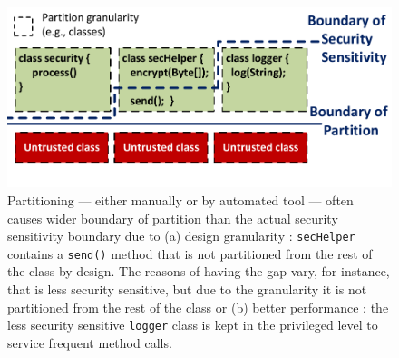 


\begin{figure}[t!]
\centering
\includegraphics[width=\linewidth]{figures/partition.pdf}
\footnotesize
\vspace{-0.3in}
\caption{
Partitioning --- either manually or by automated tool ---
often causes wider boundary of partition than the actual security sensitivity boundary
due to (a) design granularity : {\tt secHelper} contains a {\tt send()} method that is not partitioned from the rest of the class by design.
The reasons of having the gap vary, for instance, 
that is less security sensitive, but due to the granularity it is not partitioned from the rest of the class or (b) better performance :  the less security sensitive {\tt logger} class is kept in the privileged level to service frequent method calls.
}
\label{fig:partition}
\end{figure}

